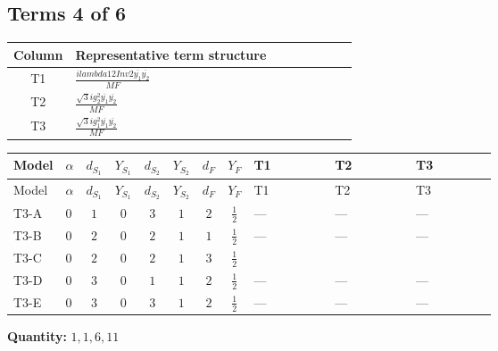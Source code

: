 \documentclass[8pt]{article}
\begin{document}
\begin{landscape}
\subsection*{Terms 4 of 6}
\begin{center}
\begin{tabular}{@{}c >{\raggedright\arraybackslash}p{0.82\linewidth}@{}}
\toprule
Column & Representative term structure \\
\midrule
T1 & \(\displaystyle \frac{i lambda12Inv2 \overline{y_{1}} \overline{y_{2}}}{MF}\) \\
\midrule
T2 & \(\displaystyle \frac{\sqrt{3} i g_{2}^{2} \overline{y_{1}} \overline{y_{2}}}{MF}\) \\
\midrule
T3 & \(\displaystyle \frac{\sqrt{3} i g_{1}^{2} \overline{y_{1}} \overline{y_{2}}}{MF}\) \\
\midrule
\bottomrule
\end{tabular}
\end{center}
\smallskip
\tiny
\begin{longtable}{@{}llcccccc >{\raggedright\arraybackslash}p{0.21\linewidth} >{\raggedright\arraybackslash}p{0.21\linewidth} >{\raggedright\arraybackslash}p{0.21\linewidth}@{}}
\toprule
Model & $\alpha$ & $d_{S_1}$ & $Y_{S_1}$ & $d_{S_2}$ & $Y_{S_2}$ & $d_F$ & $Y_F$ & T1 & T2 & T3 \\
\midrule
\endfirsthead
\toprule
Model & $\alpha$ & $d_{S_1}$ & $Y_{S_1}$ & $d_{S_2}$ & $Y_{S_2}$ & $d_F$ & $Y_F$ & T1 & T2 & T3 \\
\midrule
\endhead
T3-A & $0$ & $1$ & $0$ & $3$ & $1$ & $2$ & $\frac{1}{2}$ & --- & --- & --- \\
\midrule
T3-B & $0$ & $2$ & $0$ & $2$ & $1$ & $1$ & $\frac{1}{2}$ & --- & --- & --- \\
\midrule
T3-C & $0$ & $2$ & $0$ & $2$ & $1$ & $3$ & $\frac{1}{2}$ & \scriptsize\adjustbox{max width=\linewidth}{$\begin{gathered} - \frac{i lambda12Inv2 \overline{y_{1}} \overline{y_{2}}}{3 MF}\end{gathered}$} & \scriptsize\adjustbox{max width=\linewidth}{$\begin{gathered} - \frac{\sqrt{3} i g_{2}^{2} \overline{y_{1}} \overline{y_{2}}}{4 MF}\end{gathered}$} & \scriptsize\adjustbox{max width=\linewidth}{$\begin{gathered} - \frac{\sqrt{3} i g_{1}^{2} \overline{y_{1}} \overline{y_{2}}}{8 MF}\end{gathered}$} \\
\midrule
T3-D & $0$ & $3$ & $0$ & $1$ & $1$ & $2$ & $\frac{1}{2}$ & --- & --- & --- \\
\midrule
T3-E & $0$ & $3$ & $0$ & $3$ & $1$ & $2$ & $\frac{1}{2}$ & --- & --- & --- \\
\midrule
\bottomrule
\end{longtable}
\clearpage
\noindent\textbf{Quantity: }$\mathrm{1,1,6,11}$\par\smallskip

\end{landscape}
\end{document}
